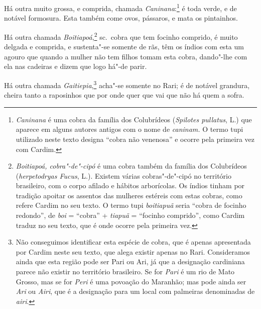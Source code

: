 \begin{linenumbers}
 Há outra muito grossa, e comprida, chamada \textit{Caninana}:\footnote{ \textit{Caninana} 
é uma cobra da família dos Colubrídeos (\textit{Spilotes pullatus}, L.) 
que aparece em alguns autores antigos com o nome de \textit{caninam.} O termo tupi utilizado neste texto
designa ``cobra não venenosa'' e ocorre pela primeira vez com Cardim.} é
toda verde, e de notável formosura. Esta também come ovos, pássaros, e mata os pintainhos.

 Há outra chamada \textit{Boitiapoá},\footnote{ \textit{Boitiapoá,
cobra"-de"-cipó} é uma cobra também da família dos Colubrídeos 
(\textit{herpetodryas Fucus}, L.). Existem várias cobras"-de"-cipó no
território brasileiro, com o corpo afilado e hábitos arborícolas. Os
índios tinham por tradição apoitar os assentos das mulheres estéreis
com estas cobras, como refere Cardim no seu texto. O termo tupi
\textit{boitiapuã} seria ``cobra de focinho redondo'', de \textit{boi} 
= ``cobra'' + \textit{tiapuã} = ``focinho comprido'', como Cardim traduz no
seu texto, que é onde ocorre pela primeira vez.} sc.~cobra que tem
focinho comprido, é muito delgada e comprida, e sustenta"-se somente de
rãs, têm os índios com esta um agouro que quando a mulher não tem
filhos tomam esta cobra, dando"-lhe com ela nas cadeiras e dizem que logo há"-de parir.

 Há outra chamada \textit{Gaitiepia},\footnote{ Não conseguimos
identificar esta espécie de cobra, que é apenas apresentada por Cardim
neste seu texto, que alega existir apenas no Rari. Consideramos ainda
que esta região pode ser Pari ou Ari, já que a designação cardiniana
parece não existir no território brasileiro. Se for \textit{Pari} é um
rio de Mato Grosso, mas se for \textit{Peri} é uma povoação do
Maranhão; mas pode ainda ser \textit{Ari} ou \textit{Airi}, 
que é a designação para um local com palmeiras denominadas de
\textit{airi}.} acha"-se somente no Rari; é de notável grandura,
cheira tanto a raposinhos que por onde quer que vai que não há quem a sofra.


\end{linenumbers}
